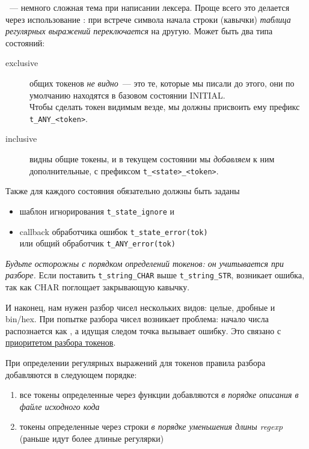 \clearpage
{}
\ --- немного сложная тема при написании лексера. Проще всего
это делается через использование : при встрече символа начала
строки (кавычки) \emph{таблица регулярных выражений переключается} на другую.
Может быть два типа состояний:

\begin{description}
\item[exclusive] общих токенов \emph{не видно}\ --- это те, которые мы писали до
этого, они по умолчанию находятся в базовом состоянии INITIAL.\\
Чтобы сделать токен видимым везде, мы должны присвоить ему префикс
\verb|t_ANY_<token>|.
\item[inclusive] видны общие токены, и в текущем состоянии мы \emph{добавляем} к
ним дополнительные, с префиксом \verb|t_<state>_<token>|.
\end{description}

\clearpage
Также для каждого состояния обязательно должны быть заданы
\begin{itemize}[nosep]
  \item 
 шаблон игнорирования \verb|t_state_ignore| и
  \item 
 callback обработчика ошибок \verb|t_state_error(tok)|\\
 или общий обработчик \verb|t_ANY_error(tok)|
\end{itemize}
\emph{Будьте осторожны с порядком определений токенов: он учитывается при
разборе.} Если поставить \verb|t_string_CHAR| выше \verb|t_string_STR|,
возникает ошибка, так как CHAR поглощает закрывающую кавычку.

\clearpage
И наконец, нам нужен разбор чисел нескольких видов: целые, дробные и bin/hex.
При попытке разбора чисел возникает проблема: начало числа распознается как
, а идущая следом точка вызывает ошибку. Это связано с
\href{http://www.dabeaz.com/ply/ply.html#ply_nn6}{приоритетом
разбора токенов}.

При определении регулярных выражений для токенов правила разбора добавляются в
следующем порядке:
\begin{enumerate}
  \item 
  все токены определенные через функции добавляются \emph{в порядке описания в
  файле исходного кода}
  \item
  токены определенные через строки \emph{в порядке уменьшения длины regexp}
  (раньше идут более длиные регулярки)
\end{enumerate}

